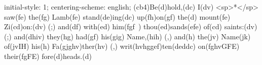 initial-style: 1;
centering-scheme: english;
(cb4)Be(d)hold,(dc) I(dv) <sp>*</sp> saw(fe) the(fg) Lamb(fe) stand(de)ing(dc) up(fh)on(gf) the(d) mount(fe) Zi(cd)on:(dv) (;) and(df) with(ed) him(fgf~) thou(ed)sands(efe) of(cd) saints:(dv) (;) and(dhiv) they(hg) had(gf) his(gig) Name,(hih) (,) and(h) the(jv) Name(jk) of(jvIH) his(h) Fa(gjghv)ther(hv) (,) writ(hvhggef)ten(deddc) on(fghvGFE) their(fgFE) fore(d)heads.(d)
